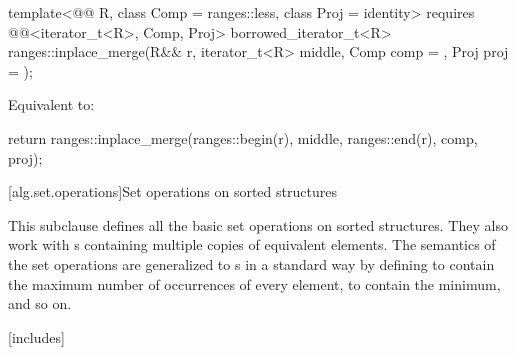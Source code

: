 \begin{itemdecl}
template<@@ R, class Comp = ranges::less, class Proj = identity>
  requires @@<iterator_t<R>, Comp, Proj>
  borrowed_iterator_t<R>
    ranges::inplace_merge(R&& r, iterator_t<R> middle, Comp comp = {}, Proj proj = {});
\end{itemdecl}

\begin{itemdescr}
\pnum
\effects
Equivalent to:
\begin{codeblock}
return ranges::inplace_merge(ranges::begin(r), middle, ranges::end(r), comp, proj);
\end{codeblock}
\end{itemdescr}

[alg.set.operations]{Set operations on sorted structures}

\pnum
This subclause defines all the basic set operations on sorted structures.
They also work with s
containing multiple copies of equivalent elements.
The semantics of the set operations are generalized to s
in a standard way by defining 
to contain the maximum number of occurrences of every element,
 to contain the minimum, and so on.

[includes]{}


